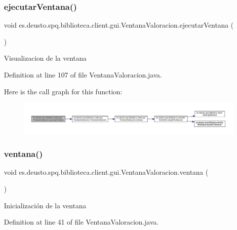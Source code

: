 \subsubsection{\texorpdfstring{ejecutar\+Ventana()}{ejecutarVentana()}}
{\footnotesize\ttfamily void es.\+deusto.\+spq.\+biblioteca.\+client.\+gui.\+Ventana\+Valoracion.\+ejecutar\+Ventana (\begin{DoxyParamCaption}{ }\end{DoxyParamCaption})}

Visualizacion de la ventana 

Definition at line 107 of file Ventana\+Valoracion.\+java.

Here is the call graph for this function\+:
\nopagebreak
\begin{figure}[H]
\begin{center}
\leavevmode
\includegraphics[width=350pt]{classes_1_1deusto_1_1spq_1_1biblioteca_1_1client_1_1gui_1_1_ventana_valoracion_a845618b09860a4932b3a818db7e5ddb4_cgraph}
\end{center}
\end{figure}
\mbox{\label{classes_1_1deusto_1_1spq_1_1biblioteca_1_1client_1_1gui_1_1_ventana_valoracion_ae8f27fb158d5eb96f275b805f40446e1}} 
\subsubsection{\texorpdfstring{ventana()}{ventana()}}
{\footnotesize\ttfamily void es.\+deusto.\+spq.\+biblioteca.\+client.\+gui.\+Ventana\+Valoracion.\+ventana (\begin{DoxyParamCaption}{ }\end{DoxyParamCaption})}

Inicialización de la ventana 

Definition at line 41 of file Ventana\+Valoracion.\+java.

